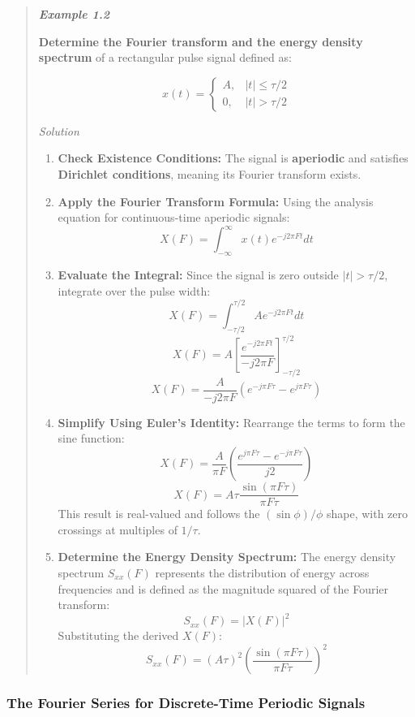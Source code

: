 \begin{quote}
\textbf{\emph{Example 1.2}}

\textbf{Determine the Fourier transform and the energy density spectrum}
of a rectangular pulse signal defined as:

\[
x(t) =
\begin{cases}
A, & |t| \leq \tau/2 \\
0, & |t| > \tau/2
\end{cases}
\]

\emph{Solution}

\begin{enumerate}
\def\labelenumi{\arabic{enumi}.}
\item
  \textbf{Check Existence Conditions:} The signal is \textbf{aperiodic}
  and satisfies \textbf{Dirichlet conditions}, meaning its Fourier
  transform exists.
\item
  \textbf{Apply the Fourier Transform Formula:} Using the analysis
  equation for continuous-time aperiodic signals:
  \[X(F) = \int_{-\infty}^{\infty} x(t)e^{-j2\pi Ft} dt\]
\item
  \textbf{Evaluate the Integral:} Since the signal is zero outside
  \(|t| > \tau/2\), integrate over the pulse width:
  \[X(F) = \int_{-\tau/2}^{\tau/2} Ae^{-j2\pi Ft} dt\]
  \[X(F) = A \left[ \frac{e^{-j2\pi Ft}}{-j2\pi F} \right]_{-\tau/2}^{\tau/2}\]
  \[X(F) = \frac{A}{-j2\pi F} (e^{-j\pi F\tau} - e^{j\pi F\tau})\]
\item
  \textbf{Simplify Using Euler's Identity:} Rearrange the terms to form
  the sine function:
  \[X(F) = \frac{A}{\pi F} \left( \frac{e^{j\pi F\tau} - e^{-j\pi F\tau}}{j2} \right)\]
  \[X(F) = A\tau \frac{\sin(\pi F\tau)}{\pi F\tau}\] This result is
  real-valued and follows the \((\sin \phi)/\phi\) shape, with zero
  crossings at multiples of \(1/\tau\).
\item
  \textbf{Determine the Energy Density Spectrum:} The energy density
  spectrum \(S_{xx}(F)\) represents the distribution of energy across
  frequencies and is defined as the magnitude squared of the Fourier
  transform: \[S_{xx}(F) = |X(F)|^2\] Substituting the derived \(X(F)\):
  \[S_{xx}(F) = (A\tau)^2 \left( \frac{\sin(\pi F\tau)}{\pi F\tau} \right)^2\]
\end{enumerate}
\end{quote}

\hypertarget{the-fourier-series-for-discrete-time-periodic-signals}{%
\subsubsection{The Fourier Series for Discrete-Time Periodic
Signals}\label{the-fourier-series-for-discrete-time-periodic-signals}}

